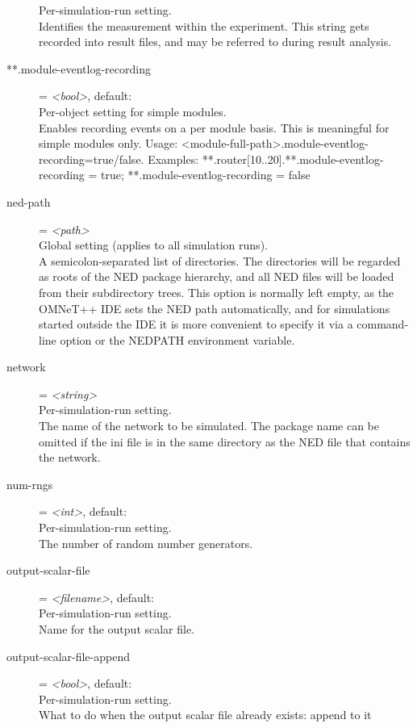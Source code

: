 \begin{description}
    Per-simulation-run setting.\\
    Identifies the measurement within the experiment. This string gets recorded
    into result files, and may be referred to during result analysis.
\item[**.module-eventlog-recording] = \textit{<bool>}, default: \\
    Per-object setting for simple modules.\\
    Enables recording events on a per module basis. This is meaningful for
    simple modules only. Usage:
    <module-full-path>.module-eventlog-recording=true/false. Examples:
    **.router[10..20].**.module-eventlog-recording = true;
    **.module-eventlog-recording = false
\item[ned-path] = \textit{<path>}\\
    Global setting (applies to all simulation runs).\\
    A semicolon-separated list of directories. The directories will be regarded
    as roots of the NED package hierarchy, and all NED files will be loaded
    from their subdirectory trees. This option is normally left empty, as the
    OMNeT++ IDE sets the NED path automatically, and for simulations started
    outside the IDE it is more convenient to specify it via a command-line
    option or the NEDPATH environment variable.
\item[network] = \textit{<string>}\\
    Per-simulation-run setting.\\
    The name of the network to be simulated.  The package name can be omitted
    if the ini file is in the same directory as the NED file that contains the
    network.
\item[num-rngs] = \textit{<int>}, default: \\
    Per-simulation-run setting.\\
    The number of random number generators.
\item[output-scalar-file] = \textit{<filename>}, default: \\
    Per-simulation-run setting.\\
    Name for the output scalar file.
\item[output-scalar-file-append] = \textit{<bool>}, default: \\
    Per-simulation-run setting.\\
    What to do when the output scalar file already exists: append to it

\end{description}
